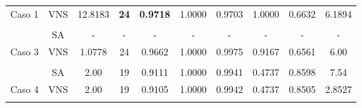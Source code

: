 \begin{table}
{\begin{tabular}{cccccccccc}
			\multicolumn{1}{c|}{\multirow{-2}{*}{Caso 1}} & VNS & 12.8183                                                              & {\color[HTML]{9A0000} \textbf{24}}                                 & {\color[HTML]{9A0000} \textbf{0.9718}}                  & 1.0000 & 0.9703 & 1.0000 & 0.6632 & 6.1894       \\
			&     &                                                                      &                                                                    &                                                         &        &        &        &        &              \\
			\multicolumn{1}{c|}{}                         & SA  & -                                                                    & -                                                                  & -                                                       & -      & -      & -      & -      & -            \\
			\multicolumn{1}{c|}{\multirow{-2}{*}{Caso 3}} & VNS & 1.0778                                                              & 24                                                                 & 0.9662
			                                                  & 1.0000 & 0.9975 & 0.9167 & 0.6561  & 6.00       \\
			&     &                                                                      &                                                                    &                                                         &        &        &        &        &              \\
			\multicolumn{1}{c|}{}                         & SA  & 2.00                                                                 & 19                                                                 & 0.9111                                                  & 1.0000 & 0.9941 & 0.4737 & 0.8598 & 7.54         \\
			\multicolumn{1}{c|}{\multirow{-2}{*}{Caso 4}} & VNS & 2.00                                                               & 19                                                                 & 0.9105                                                  & 1.0000 & 0.9942 & 0.4737 & 0.8505 & 2.8527       \\
			&     &                                                                      &                                                                    &                                                         &        &        &        &        &              \\

\end{tabular}}
\end{table}
